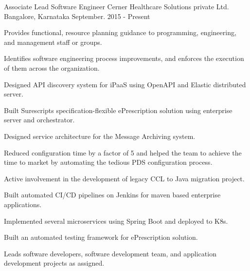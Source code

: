 

\begin{cventries}

  \cventry
    {Associate Lead Software Engineer} %
    {Cerner Healthcare Solutions private Ltd.} %
    {Bangalore, Karnataka} %
    {September. 2015 - Present} %
    {
      \begin{cvitems} %
        \item {Provides functional, resource planning guidance to programming, engineering, and management staff or groups.}
        \item {Identifies software engineering process improvements, and enforces the execution of them across the organization.}
        \item {Designed API discovery system for iPaaS using OpenAPI and Elastic distributed server.}
        \item {Built Surescripts specification-flexible ePrescription solution using enterprise server and orchestrator.}
        \item {Designed service architecture for the Message Archiving system.}
        \item {Reduced configuration time by a factor of 5 and helped the team to achieve the time to market by automating the tedious PDS configuration process.}
        \item {Active involvement in the development of legacy CCL to Java migration project.}
        \item {Built automated CI/CD pipelines on Jenkins for maven based enterprise applications.}
        \item {Implemented several microservices using Spring Boot and deployed to K8s.}
        \item {Built an automated testing framework for ePrescription solution.}
        \item {Leads software developers, software development team, and application development projects as assigned.}
      \end{cvitems}
    }


\end{cventries}
